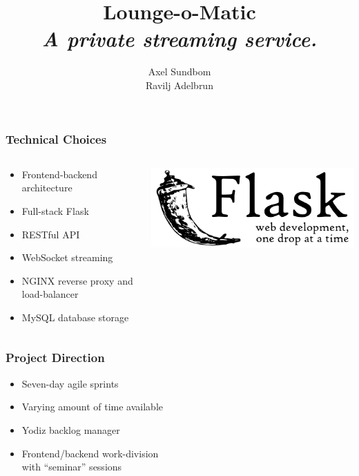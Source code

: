 \documentclass[utf8]{beamer}
\title{Lounge-o-Matic\\{\small \textit{A private streaming service.}}}
\author{Axel Sundbom\\Ravilj Adelbrun}
\begin{document}
\begin{frame}
\maketitle
\end{frame}

\begin{frame}
\frametitle{Technical Choices}

\begin{columns}
	\begin{column}{0.6\textwidth}
		\begin{itemize}
			\item Frontend-backend architecture
			\item Full-stack Flask
			\item RESTful API
			\item WebSocket streaming
			\item NGINX reverse proxy and load-balancer
			\item MySQL database storage
		\end{itemize}
	\end{column}

	\begin{column}{0.4\textwidth}
		\includegraphics[width=\textwidth]{img/flask-logo.png}
	\end{column}
\end{columns}
\end{frame}

\begin{frame}
\frametitle{Project Direction}

\begin{itemize}
	\item Seven-day agile sprints
	\item Varying amount of time available
	\item Yodiz backlog manager
	\item Frontend/backend work-division\\with ``seminar'' sessions
\end{itemize}
\end{frame}
\end{document}
